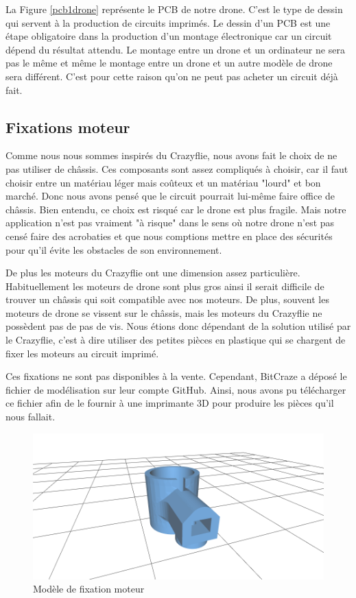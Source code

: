 \documentclass[a4paper,10pt]{report}
\begin{document}
      La Figure \ref{pcb1drone} représente le PCB de notre drone. C'est le type 
de dessin qui servent à la production de circuits imprimés. Le dessin d'un PCB 
est une étape obligatoire dans la production d'un montage électronique car un 
circuit dépend du résultat attendu. Le montage entre un drone et un ordinateur 
ne sera pas le même et même le montage entre un drone et un autre modèle de 
drone sera différent. C'est pour cette raison qu'on ne peut pas acheter un 
circuit déjà fait.
      
      \subsection{Fixations moteur}
	Comme nous nous sommes inspirés du Crazyflie, nous avons fait le choix 
de ne pas utiliser de châssis. Ces composants sont assez compliqués à choisir, 
car il faut choisir entre un matériau léger mais coûteux et un matériau "lourd" 
et bon marché. Donc nous avons pensé que le circuit pourrait lui-même faire 
office de châssis. Bien entendu, ce choix est risqué car le drone est plus 
fragile. Mais notre application n'est pas vraiment "à risque" dans le sens où 
notre drone n'est pas censé faire des acrobaties et que nous comptions mettre 
en 
place des sécurités pour qu'il évite les obstacles de son environnement.

	De plus les moteurs du Crazyflie ont une dimension assez particulière. 
Habituellement les moteurs de drone sont plus gros ainsi il serait difficile de 
trouver un châssis qui soit compatible avec nos moteurs. De plus, souvent les 
moteurs de drone se vissent sur le châssis, mais les moteurs du Crazyflie ne 
possèdent pas de pas de vis. Nous étions donc dépendant de la solution utilisé 
par le Crazyflie, c'est à dire utiliser des petites pièces en plastique qui se 
chargent de fixer les moteurs au circuit imprimé.

	Ces fixations ne sont pas disponibles à la vente. Cependant, BitCraze a 
déposé le fichier de modélisation sur leur compte GitHub\cite{gitbit}. Ainsi, 
nous avons pu télécharger ce fichier afin de le fournir à une imprimante 3D 
pour produire les pièces qu'il nous fallait.

      \begin{figure}[htbp]%
	\centering
	\includegraphics[scale = 0.4]{img/model_fixation.png}
	\caption{Modèle de fixation moteur}
	\label{fixationmodel}
      \end{figure}
      
\end{document}
